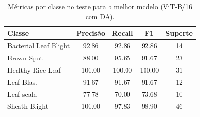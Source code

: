 \begin{table}[t]
\centering
\caption{Métricas por classe no teste para o melhor modelo (ViT-B/16 com DA).}
\label{tab:porclasse}
\begin{tabular}{lcccc}
\toprule
Classe & Precisão & Recall & F1 & Suporte \\
\midrule
Bacterial Leaf Blight & 92.86 & 92.86 & 92.86 & 14 \\
Brown Spot & 88.00 & 95.65 & 91.67 & 23 \\
Healthy Rice Leaf & 100.00 & 100.00 & 100.00 & 31 \\
Leaf Blast & 91.67 & 91.67 & 91.67 & 12 \\
Leaf scald & 77.78 & 70.00 & 73.68 & 10 \\
Sheath Blight & 100.00 & 97.83 & 98.90 & 46 \\
\bottomrule
\end{tabular}
\end{table}
